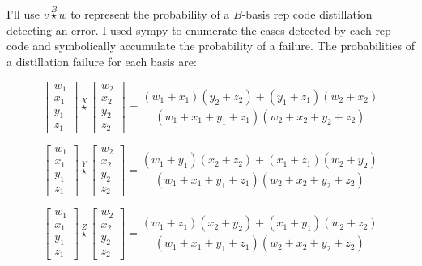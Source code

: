 \documentclass[onecolumn,unpublished,a4paper]{quantumarticle}
\theoremstyle{definition}
\theoremstyle{definition}
\theoremstyle{definition}
\begin{document}
I'll use $v \stackrel{B}{\star} w$ to represent the probability of a $B$-basis rep code distillation detecting an error.
I used sympy to enumerate the cases detected by each rep code and symbolically accumulate the probability of a failure.
The probabilities of a distillation failure for each basis are:

\begin{equation}
\begin{bmatrix}w_1\\x_1\\y_1\\z_1\end{bmatrix}
\stackrel{X}{\star}
\begin{bmatrix}w_2\\x_2\\y_2\\z_2\end{bmatrix}
= \frac{(w_1 + x_1)(y_2 + z_2) + (y_1 + z_1)(w_2 + x_2)}{(w_1+x_1+y_1+z_1)(w_2+x_2+y_2+z_2)}
\end{equation}


\begin{equation}
\begin{bmatrix}w_1\\x_1\\y_1\\z_1\end{bmatrix}
\stackrel{Y}{\star}
\begin{bmatrix}w_2\\x_2\\y_2\\z_2\end{bmatrix}
= \frac{(w_1 + y_1)(x_2 + z_2) + (x_1 + z_1)(w_2 + y_2)}{(w_1+x_1+y_1+z_1)(w_2+x_2+y_2+z_2)}
\end{equation}


\begin{equation}
\begin{bmatrix}w_1\\x_1\\y_1\\z_1\end{bmatrix}
\stackrel{Z}{\star}
\begin{bmatrix}w_2\\x_2\\y_2\\z_2\end{bmatrix}
= \frac{(w_1 + z_1)(x_2 + y_2) + (x_1 + y_1)(w_2 + z_2)}{(w_1+x_1+y_1+z_1)(w_2+x_2+y_2+z_2)}
\end{equation}
\end{document}
